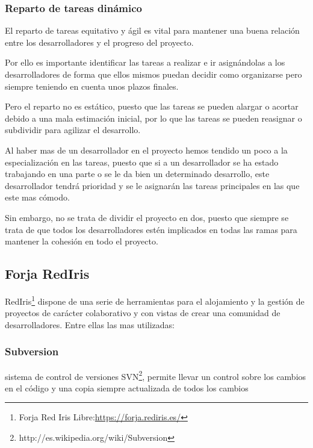 \subsubsection*{Reparto de tareas dinámico} %
El reparto de tareas equitativo y ágil es vital para mantener una buena
relación entre los desarrolladores y el progreso del proyecto.

Por ello es importante identificar las tareas a realizar e ir asignándolas a
los desarrolladores de forma que ellos mismos puedan decidir como organizarse
pero siempre teniendo en cuenta unos plazos finales.

Pero el reparto no es estático, puesto que las tareas se pueden alargar o
acortar debido a una mala estimación inicial, por lo que las tareas se pueden
reasignar o subdividir para agilizar el desarrollo.

Al haber mas de un desarrollador en el proyecto hemos tendido un poco a la
especialización en las tareas, puesto que si a un desarrollador se ha estado
trabajando en una parte o se le da bien un determinado desarrollo, este
desarrollador tendrá prioridad y se le asignarán las tareas principales en las
que este mas cómodo.

Sin embargo, no se trata de dividir el proyecto en dos, puesto que siempre se
trata de que todos los desarrolladores estén implicados en todas las ramas
para mantener la cohesión en todo el proyecto.

\subsection*{Forja RedIris}
RedIris\footnote{Forja Red Iris Libre:\url{https://forja.rediris.es/}} dispone
de una serie de
herramientas para el alojamiento y la gestión de proyectos de carácter
colaborativo y con vistas de crear una comunidad de desarrolladores.
Entre ellas las mas utilizadas:
\subsubsection*{Subversion}
sistema de control de versiones
SVN\footnote{http://es.wikipedia.org/wiki/Subversion}, permite llevar un
control sobre los cambios en el código y una copia siempre actualizada de
todos los cambios
